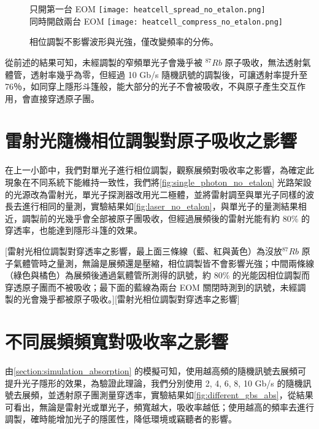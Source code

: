 \documentclass[class=NCU_thesis, crop=false]{standalone}
\begin{document}
\begin{figure}[!hbt]
    \centering
    \subcaptionbox
        {只開第一台 EOM
        \label{fig:spread_absorption_g2}}
        {\texttt{[image: heatcell\_spread\_no\_etalon.png]}}
    ~~~~
    \subcaptionbox
        {同時開啟兩台 EOM
        \label{fig:compress_absorption_g2}}
        {\texttt{[image: heatcell\_compress\_no\_etalon.png]}}
    \caption{相位調製不影響波形與光強，僅改變頻率的分佈。}
    \label{fig:spread_or_not}
\end{figure}

從前述的結果可知，未經調製的窄頻單光子會幾乎被 $^{87}Rb$ 原子吸收，無法透射氣體管，透射率幾乎為零，但經過 10 Gb/s 隨機訊號的調製後，可讓透射率提升至 76％，如同穿上隱形斗篷般，能大部分的光子不會被吸收，不與原子產生交互作用，會直接穿透原子團。

\section{雷射光隨機相位調製對原子吸收之影響}
在上一小節中，我們對單光子進行相位調製，觀察展頻對吸收率之影響，為確定此現象在不同系統下能維持一致性，我們將\cref{fig:single_photon_no_etalon} 光路架設的光源改為雷射光，單光子探測器改用光二極體，並將雷射調至與單光子同樣的波長去進行相同的量測，實驗結果如\cref{fig:laser_no_etalon}，與單光子的量測結果相近，調製前的光幾乎會全部被原子團吸收，但經過展頻後的雷射光能有約 80\% 的穿透率，也能達到隱形斗篷的效果。

[雷射光相位調製對穿透率之影響，最上面三條線（藍、紅與黃色）為沒放$^{87}Rb$ 原子氣體管時之量測，無論是展頻還是壓縮，相位調製皆不會影響光強；中間兩條線（綠色與橘色）為展頻後通過氣體管所測得的訊號，約 80\% 的光能因相位調製而穿透原子團而不被吸收；最下面的藍線為兩台 EOM 關閉時測到的訊號，未經調製的光會幾乎都被原子吸收。][雷射光相位調製對穿透率之影響]

\section{不同展頻頻寬對吸收率之影響}
由\cref{section:simulation_absorption} 的模擬可知，使用越高頻的隨機訊號去展頻可提升光子隱形的效果，為驗證此理論，我們分別使用 2, 4, 6, 8, 10 Gb/s 的隨機訊號去展頻，並透射原子團測量穿透率，實驗結果如\cref{fig:different_gbs_abs}，從結果可看出，無論是雷射光或單光子，頻寬越大，吸收率越低；使用越高的頻率去進行調製，確時能增加光子的隱匿性，降低環境或竊聽者的影響。
\end{document}
